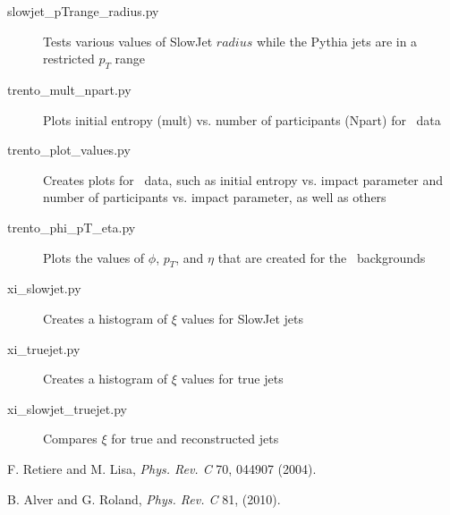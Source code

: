\documentclass[11pt]{article}
\begin{document}
\begin{description}
\item[slowjet\_pTrange\_radius.py] Tests various values of SlowJet $radius$ while the Pythia jets are in a restricted $p_T$ range
%
\item[trento\_mult\_npart.py] Plots initial entropy (mult) vs. number of participants (Npart) for \trento\ data
\item[trento\_plot\_values.py] Creates plots for \trento\ data, such as initial entropy vs. impact parameter and number of participants vs. impact parameter, as well as others
\item[trento\_phi\_pT\_eta.py] Plots the values of $\phi$, $p_T$, and $\eta$ that are created for the \trento\ backgrounds
%
\item[xi\_slowjet.py] Creates a histogram of $\xi$ values for SlowJet jets
\item[xi\_truejet.py] Creates a histogram of $\xi$ values for true jets
\item[xi\_slowjet\_truejet.py] Compares $\xi$ for true and reconstructed jets
\end{description}


\begin{thebibliography}{10}

F. Retiere and M. Lisa, {\em Phys. Rev. C} 70, 044907 (2004).

B. Alver and G. Roland, {\em Phys. Rev. C} 81, (2010).

\end{thebibliography}
\end{document}
